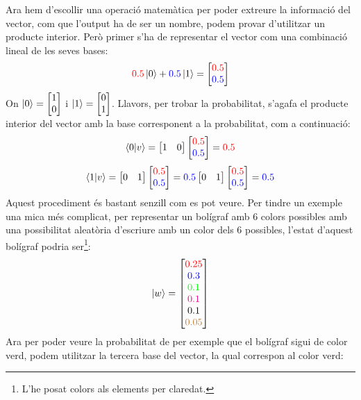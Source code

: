 Ara hem d'escollir una operació matemàtica per poder extreure la informació del vector, com que l'output ha de ser un nombre, podem provar d'utilitzar un producte interior. Però primer s'ha de representar el vector com una combinació lineal de les seves bases:
$$
\textcolor{red}{0.5}\ket{0} + \textcolor{blue}{0.5}\ket{1} = \begin{bmatrix}
	\textcolor{red}{0.5} \\
	\textcolor{blue}{0.5}
\end{bmatrix}
$$
On $\ket{0} = \begin{bmatrix} 1 \\ 0\end{bmatrix}$ i $\ket{1} = \begin{bmatrix} 0 \\ 1 \end{bmatrix}$.
Llavors, per trobar la probabilitat, s'agafa el producte interior del vector amb la base corresponent a la probabilitat, com a continuació:
$$
\bra{0}\ket{v} =
\begin{bmatrix}
	1 &
	0
\end{bmatrix}
\begin{bmatrix}
	\textcolor{red}{0.5} \\
	\textcolor{blue}{0.5}
\end{bmatrix}
= \textcolor{red}{0.5}
$$
$$
\bra{1}\ket{v} =
\begin{bmatrix}
	0 &
	1
\end{bmatrix}
\begin{bmatrix}
	\textcolor{red}{0.5} \\
	\textcolor{blue}{0.5}
\end{bmatrix}
= \textcolor{blue}{0.5}
	\begin{bmatrix}
		0 &
		1
	\end{bmatrix}
	\begin{bmatrix}
		\textcolor{red}{0.5} \\
		\textcolor{blue}{0.5}
	\end{bmatrix}
	= \textcolor{blue}{0.5}
$$
Aquest procediment és bastant senzill com es pot veure. Per tindre un exemple una mica més complicat, per representar un bolígraf amb 6 colors possibles amb una possibilitat aleatòria d'escriure amb un color dels 6 possibles, l'estat d'aquest bolígraf podria ser\footnote{L'he posat colors als elements per claredat.}:
$$
\ket{w} =
\begin{bmatrix}
	\textcolor{red}{0.25} \\
	\textcolor{blue}{0.3 }\\
	\textcolor{green}{0.1 }\\
	\textcolor{magenta}{0.1 }\\
	\textcolor{black}{0.1 }\\
	\textcolor{brown}{0.05}
\end{bmatrix}
$$
Ara per poder veure la probabilitat de per exemple que el bolígraf sigui de color verd, podem utilitzar la tercera base del vector, la qual correspon al color verd:

